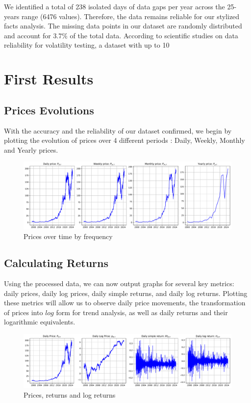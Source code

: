 \documentclass{article}
\begin{document}
\noindent We identified a total of 238 isolated days of data gaps per year across the 25-years range (6476 values). 
Therefore, the data remains reliable for our stylized facts analysis. 
The missing data points in our dataset are randomly distributed and account for 3.7\% of the total data. 
According to scientific studies on data reliability for volatility testing, a dataset with up to 10%
\cite{pumi2023longrange} 

\section{First Results}

\subsection{Prices Evolutions}

With the accuracy and the reliability of our dataset confirmed, we begin by plotting the evolution of prices over 4 different periods : Daily, Weekly, Monthly and Yearly prices.

\begin{figure}[H]
    \centering
    \includegraphics[width=\textwidth]{Img/prices_time.pdf}
    \caption{Prices over time by frequency}
    \label{fig:prices_time}
\end{figure}

\subsection{Calculating Returns}
Using the processed data, we can now output graphs for several key metrics: 
daily prices, daily log prices, daily simple returns, and daily log returns. 
Plotting these metrics will allow us to observe daily price movements, 
the transformation of prices into $log$ form for trend analysis, 
as well as daily returns and their logarithmic equivalents.
\begin{figure}[H]
    \centering
    \includegraphics[width=\textwidth]{Img/log_returns.pdf}
    \caption{Prices, returns and log returns}
    \label{fig:log_returns}
\end{figure}
\end{document}

